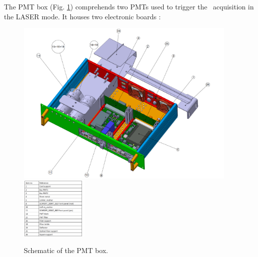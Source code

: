 The PMT box (Fig. \ref{fig:laspmtbox}) comprehends two PMTs used to trigger the \laserii~acquisition in the LASER mode. It houses two electronic boards :


\begin{figure}[htbp]
\centering
\includegraphics[height=8cm]{figures/pmtbox_meca.pdf}
\includegraphics[height=3cm]{figures/pmtbox_list.pdf}
\caption{Schematic of the PMT box.}\label{fig:laspmtbox}
\end{figure}




